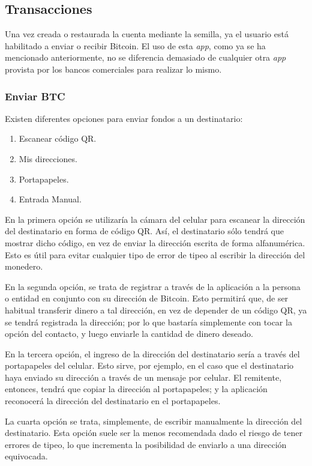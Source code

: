 \documentclass[12pt,a4paper,twoside]{book}
\begin{document}
\subsection{Transacciones}
Una vez creada o restaurada la cuenta mediante la semilla, ya el usuario está habilitado a enviar o recibir Bitcoin. El uso de esta \textit{app}, como ya se ha mencionado anteriormente, no se diferencia demasiado de cualquier otra \textit{app} provista por los bancos comerciales para realizar lo mismo.

\subsubsection{Enviar BTC}
Existen diferentes opciones para enviar fondos a un destinatario:

\begin{enumerate}
\item Escanear código QR.
\item Mis direcciones.
\item Portapapeles.
\item Entrada Manual.
\end{enumerate}

En la primera opción se utilizaría la cámara del celular para escanear la dirección del destinatario en forma de código QR. Así, el destinatario sólo tendrá que mostrar dicho código, en vez de enviar la dirección escrita de forma alfanumérica. Esto es útil para evitar cualquier tipo de error de tipeo al escribir la dirección del monedero.

En la segunda opción, se trata de registrar a través de la aplicación a la persona o entidad en conjunto con su dirección de Bitcoin. Esto permitirá que, de ser habitual transferir dinero a tal dirección, en vez de depender de un código QR, ya se tendrá registrada la dirección; por lo que bastaría simplemente con tocar la opción del contacto, y luego enviarle la cantidad de dinero deseado.

En la tercera opción, el ingreso de la dirección del destinatario sería a través del portapapeles del celular. Esto sirve, por ejemplo, en el caso que el destinatario haya enviado su dirección a través de un mensaje por celular. El remitente, entonces, tendrá que copiar la dirección al portapapeles; y la aplicación reconocerá la dirección del destinatario en el portapapeles.

La cuarta opción se trata, simplemente, de escribir manualmente la dirección del destinatario. Esta opción suele ser la menos recomendada dado el riesgo de tener errores de tipeo, lo que incrementa la posibilidad de enviarlo a una dirección equivocada.
\end{document}
